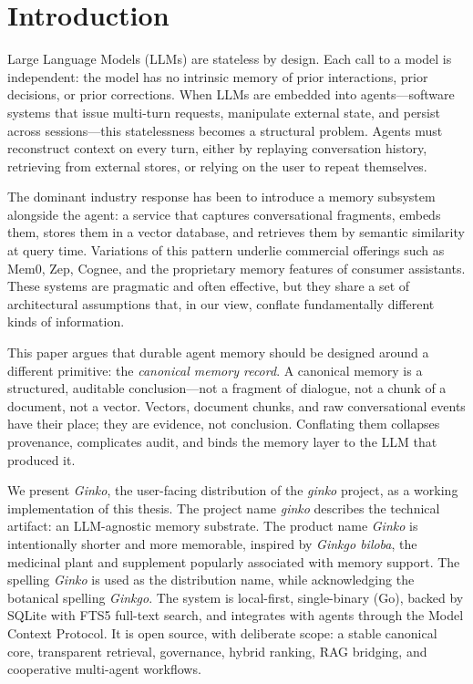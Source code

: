 \documentclass[11pt,a4paper]{article}
\begin{document}
\section{Introduction}

Large Language Models (LLMs) are stateless by design. Each call to a model is independent: the model has no intrinsic memory of prior interactions, prior decisions, or prior corrections. When LLMs are embedded into agents---software systems that issue multi-turn requests, manipulate external state, and persist across sessions---this statelessness becomes a structural problem. Agents must reconstruct context on every turn, either by replaying conversation history, retrieving from external stores, or relying on the user to repeat themselves.

The dominant industry response has been to introduce a memory subsystem alongside the agent: a service that captures conversational fragments, embeds them, stores them in a vector database, and retrieves them by semantic similarity at query time. Variations of this pattern underlie commercial offerings such as Mem0, Zep, Cognee, and the proprietary memory features of consumer assistants. These systems are pragmatic and often effective, but they share a set of architectural assumptions that, in our view, conflate fundamentally different kinds of information.

This paper argues that durable agent memory should be designed around a different primitive: the \emph{canonical memory record}. A canonical memory is a structured, auditable conclusion---not a fragment of dialogue, not a chunk of a document, not a vector. Vectors, document chunks, and raw conversational events have their place; they are evidence, not conclusion. Conflating them collapses provenance, complicates audit, and binds the memory layer to the LLM that produced it.

We present \textit{Ginko}, the user-facing distribution of the \textit{ginko} project, as a working implementation of this thesis. The project name \textit{ginko} describes the technical artifact: an LLM-agnostic memory substrate. The product name \textit{Ginko} is intentionally shorter and more memorable, inspired by \textit{Ginkgo biloba}, the medicinal plant and supplement popularly associated with memory support. The spelling \textit{Ginko} is used as the distribution name, while acknowledging the botanical spelling \textit{Ginkgo}. The system is local-first, single-binary (Go), backed by SQLite with FTS5 full-text search, and integrates with agents through the Model Context Protocol. It is open source, with deliberate scope: a stable canonical core, transparent retrieval, governance, hybrid ranking, RAG bridging, and cooperative multi-agent workflows.
\end{document}
